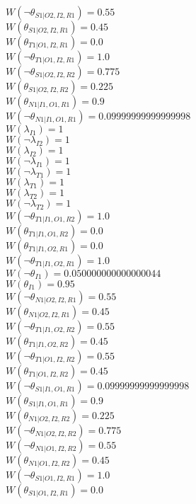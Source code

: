 $W(\neg\theta_{S1|O2,I2,R1})=0.55$\\
$W(\theta_{S1|O2,I2,R1})=0.45$\\
$W(\theta_{T1|O1,I2,R1})=0.0$\\
$W(\neg\theta_{T1|O1,I2,R1})=1.0$\\
$W(\neg\theta_{S1|O2,I2,R2})=0.775$\\
$W(\theta_{S1|O2,I2,R2})=0.225$\\
$W(\theta_{N1|I1,O1,R1})=0.9$\\
$W(\neg\theta_{N1|I1,O1,R1})=0.09999999999999998$\\
$W(\lambda_{I1})=1$\\
$W(\neg\lambda_{I2})=1$\\
$W(\lambda_{I2})=1$\\
$W(\neg\lambda_{I1})=1$\\
$W(\neg\lambda_{T1})=1$\\
$W(\lambda_{T1})=1$\\
$W(\lambda_{T2})=1$\\
$W(\neg\lambda_{T2})=1$\\
$W(\neg\theta_{T1|I1,O1,R2})=1.0$\\
$W(\theta_{T1|I1,O1,R2})=0.0$\\
$W(\theta_{T1|I1,O2,R1})=0.0$\\
$W(\neg\theta_{T1|I1,O2,R1})=1.0$\\
$W(\neg\theta_{I1})=0.050000000000000044$\\
$W(\theta_{I1})=0.95$\\
$W(\neg\theta_{N1|O2,I2,R1})=0.55$\\
$W(\theta_{N1|O2,I2,R1})=0.45$\\
$W(\neg\theta_{T1|I1,O2,R2})=0.55$\\
$W(\theta_{T1|I1,O2,R2})=0.45$\\
$W(\neg\theta_{T1|O1,I2,R2})=0.55$\\
$W(\theta_{T1|O1,I2,R2})=0.45$\\
$W(\neg\theta_{S1|I1,O1,R1})=0.09999999999999998$\\
$W(\theta_{S1|I1,O1,R1})=0.9$\\
$W(\theta_{N1|O2,I2,R2})=0.225$\\
$W(\neg\theta_{N1|O2,I2,R2})=0.775$\\
$W(\neg\theta_{N1|O1,I2,R2})=0.55$\\
$W(\theta_{N1|O1,I2,R2})=0.45$\\
$W(\neg\theta_{S1|O1,I2,R1})=1.0$\\
$W(\theta_{S1|O1,I2,R1})=0.0$\\

